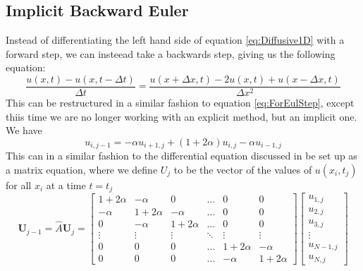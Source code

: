 \documentclass[a4paper,10pt,english]{article}
\renewcommand{\vec}[1]{\mathbf{#1}}
\begin{document}
\subsection*{Implicit Backward Euler}
Instead of differentiating the left hand side of equation \ref{eq:Diffusive1D} with a forward step, we can insteead take a backwards step, giving us the following equation:
\begin{equation}
\dfrac{u(x,t) - u(x,t-\Delta t)}{\Delta t} = \dfrac{u(x +\Delta x, t)  -2u(x,t) + u(x-\Delta x , t)}{\Delta x^2}
\label{eq:BWDifferentiation}
\end{equation}
This can be restructured in a similar fashion to equation \ref{eq:ForEulStep}, except thiis time we are no longer working with an explicit method, but an implicit one. We have
\begin{equation}
u_{i,j-1} = -\alpha u_{i+1, j} + (1 + 2\alpha)u_{i,j} - \alpha u_{i-1, j} 
\label{eq:BWEulerStep}
\end{equation}
This can in a similar fashion to the differential equation discussed in \cite{Rapport1} be set up as a matrix equation, where we define $U_j$ to be the vector of the values of $u(x_i, t_j)$ for all $x_i$ at a time $t=t_j$
\begin{equation}
\vec{U}_{j-1} = \hat{A} \vec{U}_{j} = \begin{bmatrix}1 + 2 \alpha & -\alpha  & 0 & \hdots & 0 & 0 \\ -\alpha & 1 + 2 \alpha & -\alpha &  \hdots & 0 & 0 \\ 0 & -\alpha & 1 + 2 \alpha  & \hdots & 0 & 0 \\ \vdots & \vdots & \vdots  & \ddots & \vdots & \vdots \\0 & 0 & 0 &  \hdots & 1 + 2\alpha &  -\alpha  \\ 0 & 0 & 0 & \hdots &  -\alpha  & 1 + 2\alpha \end{bmatrix}\begin{bmatrix}
u_{1,j} \\ u_{2,j} \\ u_{3,j} \\ \vdots \\ u_{N-1,j} \\ u_{N,j}
\end{bmatrix}
\label{eq:MatrixBWEul}
\end{equation}
\end{document}
